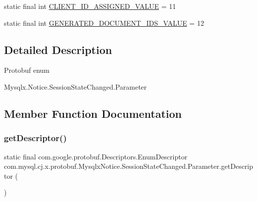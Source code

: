 \begin{DoxyCompactItemize}
\item 
static final int \mbox{\hyperlink{enumcom_1_1mysql_1_1cj_1_1x_1_1protobuf_1_1_mysqlx_notice_1_1_session_state_changed_1_1_parameter_a7877e0721f29e9087e15466fbef69f2f}{C\+L\+I\+E\+N\+T\+\_\+\+I\+D\+\_\+\+A\+S\+S\+I\+G\+N\+E\+D\+\_\+\+V\+A\+L\+UE}} = 11
\item 
static final int \mbox{\hyperlink{enumcom_1_1mysql_1_1cj_1_1x_1_1protobuf_1_1_mysqlx_notice_1_1_session_state_changed_1_1_parameter_a0cc5511cf0412d80fe321caca10bb108}{G\+E\+N\+E\+R\+A\+T\+E\+D\+\_\+\+D\+O\+C\+U\+M\+E\+N\+T\+\_\+\+I\+D\+S\+\_\+\+V\+A\+L\+UE}} = 12
\end{DoxyCompactItemize}


\subsection{Detailed Description}
Protobuf enum
\begin{DoxyCode}
Mysqlx.Notice.SessionStateChanged.Parameter 
\end{DoxyCode}
 

\subsection{Member Function Documentation}
\mbox{\label{enumcom_1_1mysql_1_1cj_1_1x_1_1protobuf_1_1_mysqlx_notice_1_1_session_state_changed_1_1_parameter_a4b112d5d7eaef504d4b3349e2f4b4c81}} 
\subsubsection{\texorpdfstring{get\+Descriptor()}{getDescriptor()}}
{\footnotesize\ttfamily static final com.\+google.\+protobuf.\+Descriptors.\+Enum\+Descriptor com.\+mysql.\+cj.\+x.\+protobuf.\+Mysqlx\+Notice.\+Session\+State\+Changed.\+Parameter.\+get\+Descriptor (\begin{DoxyParamCaption}{ }\end{DoxyParamCaption})\hspace{0.3cm}{\ttfamily [static]}}

